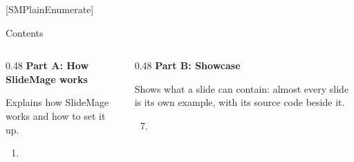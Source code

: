 
[SMPlainEnumerate]
\begin{standardframe}{Contents}
	\small
	\SMDeckAgenda
	\par\medskip
	\begin{columns}[t,onlytextwidth]
		\begin{column}{0.48\linewidth}
			\textcolor{c_primary_highlight}{\textbf{Part A: How SlideMage works}}\par\smallskip
			Explains how SlideMage works and how to set it up.
			\begin{enumerate}
				\tableofcontents[sections={1-6},hideallsubsections]
				\ifnum\value{enumi}=0 \item[] \fi
			\end{enumerate}
		\end{column}
		\begin{column}{0.48\linewidth}
			\textcolor{c_primary_highlight}{\textbf{Part B: Showcase}}\par\smallskip
			Shows what a slide can contain: almost every slide is its own example, with its source code beside it.
			\begin{enumerate}
				\setcounter{enumi}{6}
				\tableofcontents[sections={7-12},hideallsubsections]
				\ifnum\value{enumi}=6 \item[] \fi
			\end{enumerate}
		\end{column}
	\end{columns}
\end{standardframe}
